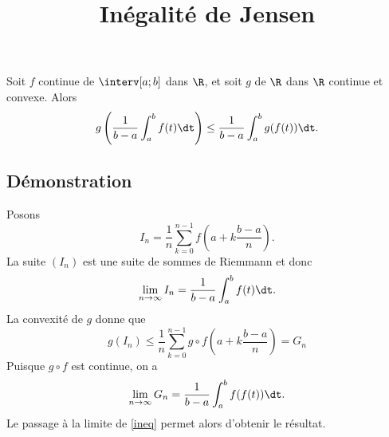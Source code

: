 \documentclass[fontsize=12pt,twoside=false,parskip=half, french]{scrartcl}
\title{Inégalité de Jensen}
\date{}
\author{}
\begin{document}
\maketitle
   \begin{Theoreme}
      Soit $f$ continue de $\interv[a; b]$ dans $\R$, et soit $g$ de $\R$ dans
      $\R$ continue et convexe. Alors
      \[
         g\left( \frac{1}{b - a} \int_a^b f(t) \dt \right) \leq
         \frac{1}{b - a} \int_a^b g(f(t)) \dt.
      \]
   \end{Theoreme}
   \subsection{Démonstration}
      Posons
      \[
         I_n = \frac{1}{n} \sum_{k = 0}^{n - 1} f\left(a + k \frac{b - a}{n}\right).
      \]
      La suite $(I_n)$ est une suite de sommes de Riemmann et donc
      \[
         \lim_{n \to \infty} I_n = \frac{1}{b - a} \int_a^b f(t) \dt.
      \]
      La convexité de $g$ donne que
      \begin{equation}
         g(I_n) \leq \frac{1}{n} \sum_{k = 0}^{n - 1} g \circ f\left(a + k \frac{b - a}{n}\right) = G_n  \label{ineq}
      \end{equation}
      Puisque $g \circ f$ est continue, on a 
      \[
         \lim_{n \to \infty} G_n = \frac{1}{b - a} \int_a^b f(f(t)) \dt.
      \]
      Le passage à la limite de \eqref{ineq} permet alors d’obtenir le résultat.
\end{document}
